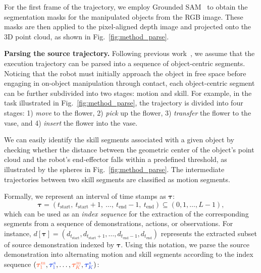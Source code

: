 For the first frame of the trajectory, we employ Grounded SAM~\cite{ren2024grounded} to obtain the segmentation masks for the manipulated objects from the RGB image. These masks are then applied to the pixel-aligned depth image and projected onto the 3D point cloud, as shown in Fig.~\ref{fig:method_parse}.


\vspace{0.2cm} 
\noindent \textbf{Parsing the source trajectory.}  
Following previous work~\cite{mandlekar2023mimicgen, garrett2024skillmimicgen}, we assume that the execution trajectory can be parsed into a sequence of object-centric segments. Noticing that the robot must initially \textcolor{myorange}{approach} the object in free space before engaging in on-object manipulation through \textcolor{myblue}{contact}, each object-centric segment can be further subdivided into two stages: \textcolor{myorange}{motion} and \textcolor{myblue}{skill}. For example, in the task illustrated in Fig.~\ref{fig:method_parse}, the trajectory is divided into four stages: \textcolor{myorange}{1) \textit{move} to the flower}, \textcolor{myblue}{2) \textit{pick} up the flower}, \textcolor{myorange}{3) \textit{transfer} the flower to the vase}, and \textcolor{myblue}{4) \textit{insert} the flower into the vase}.

We can easily identify the skill segments associated with a given object by checking whether the distance between the geometric center of the object's point cloud and the robot's end-effector falls within a predefined threshold, as illustrated by the spheres in Fig.~\ref{fig:method_parse}. The intermediate trajectories between two skill segments are classified as motion segments.

Formally, we represent an interval of time stamps as $\bm{\tau}$:
\begin{equation*}
    \bm{\tau} = (t_{\mathrm{start}},~ t_{\mathrm{start}}+1,~ \dots, ~t_{\mathrm{end}}-1,~ t_{\mathrm{end}})\subseteq(0,1,\dots,L-1),
\end{equation*}
which can be used as an \textit{index sequence} for the extraction of the corresponding segments from a sequence of demonstrations, actions, or observations. For instance, $d[\bm{\tau}] = (d_{t_{\mathrm{start}}},d_{t_{\mathrm{start}}+1},\dots,d_{t_{\mathrm{end}}-1}, d_{t_{\mathrm{end}}})$ represents the extracted subset of source demonstration indexed by $\bm{\tau}$.
Using this notation, we parse the source demonstration into alternating \textcolor{myorange}{motion} and \textcolor{myblue}{skill} segments according to the index sequence
$(\textcolor{myorange}{\bm{\tau}^{\mathrm{m}}_1}, \textcolor{myblue}{\bm{\tau}^{\mathrm{s}}_1}, \dots, \textcolor{myorange}{\bm{\tau}^{\mathrm{m}}_K}, \textcolor{myblue}{\bm{\tau}^{\mathrm{s}}_K})$:

